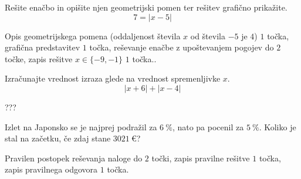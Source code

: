 \documentclass[addpoints]{exam}
\begin{document}
\begin{questions}
    \question[5]
    Rešite enačbo in opišite njen geometrijski pomen ter rešitev grafično prikažite.
    $$  7=\left\lvert x-5\right\rvert $$
    
    
    \begin{solution}[8cm]
        Opis geometrijskega pomena (oddaljenost števila $x$ od števila $-5$ je $4$) $1$ točka, grafična predstavitev $1$ točka, reševanje enačbe z upoštevanjem pogojev do $2$ točke, zapis rešitve $x\in\{-9,-1\}$ $1$ točka..
    \end{solution}


    \newpage





    \question[5]
    Izračunajte vrednost izraza glede na vrednost spremenljivke $x$.
    $$\left\lvert x+6 \right\rvert + \left\lvert x-4 \right\rvert $$
    
    
    \begin{solution}[10cm]
        ???
    \end{solution}


    
    




    \question[4]
    Izlet na Japonsko se je najprej podražil za $6~\%$, nato pa pocenil za $5~\%$. 
    Koliko je stal na začetku, če zdaj stane $3021~€$?
    
    
    \begin{solution}[3cm]
        Pravilen postopek reševanja naloge do $2$ točki, zapis pravilne rešitve $1$ točka, zapis pravilnega odgovora $1$ točka.
    \end{solution}

     \newpage



    

\end{questions}
\end{document}
